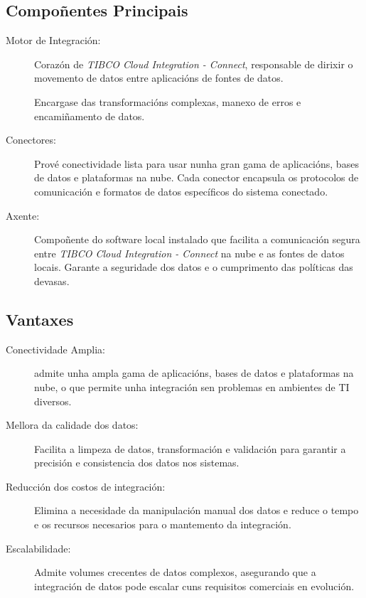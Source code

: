 \subsection{Compoñentes Principais}

\begin{description}
    \item[Motor de Integración:] Corazón de \textit{TIBCO Cloud Integration - Connect}, responsable de dirixir o movemento de datos entre aplicacións de fontes de datos.
    
    Encargase das transformacións complexas, manexo de erros e encamiñamento de datos.
    
    \item[Conectores:] Prové conectividade lista para usar nunha gran gama de aplicacións, bases de datos e plataformas na nube. Cada conector encapsula os protocolos de comunicación e formatos de datos específicos do sistema conectado.
    
    \item[Axente:] Compoñente do software local instalado que facilita a comunicación segura entre \textit{TIBCO Cloud Integration - Connect} na nube e as fontes de datos locais. Garante a seguridade dos datos e o cumprimento das políticas das devasas.
\end{description}

\subsection{Vantaxes}

\begin{description}
    \item[Conectividade Amplia:] admite unha ampla gama de aplicacións, bases de datos e plataformas na nube, o que permite unha integración sen problemas en ambientes de TI diversos.
    
    \item[Mellora da calidade dos datos:] Facilita a limpeza de datos, transformación e validación para garantir a precisión e consistencia dos datos nos sistemas.
    
    \item[Reducción dos costos de integración:] Elimina a necesidade da manipulación manual dos datos e reduce o tempo e os recursos necesarios para o mantemento da integración.
    
    \item[Escalabilidade:] Admite volumes crecentes de datos complexos, asegurando que a integración de datos pode escalar cuns requisitos comerciais en evolución.
\end{description}
